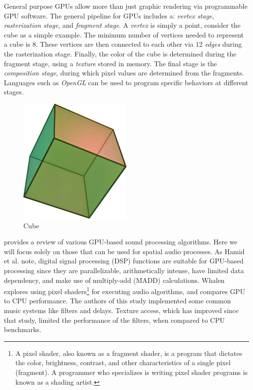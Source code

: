 General purpose GPUs allow more than just graphic rendering via programmable GPU software. The general pipeline for GPUs includes a: \textit{vertex stage}, \textit{rasterization stage}, and \textit{fragment stage}. A \textit{vertex} is simply a point, consider the cube as a simple example. The minimum number of vertices needed to represent a cube is 8. These vertices are then connected to each other via 12 \textit{edges} during the rasterization stage. Finally, the color of the cube is determined during the fragment stage, using a \textit{texture} stored in memory. The final stage is the \textit{composition stage}, during which pixel values are determined from the fragments. Languages such as \textit{OpenGL} can be used to program specific behaviors at different stages. 

\begin{figure}[ht!]%
\centering
\includegraphics[width=0.5\textwidth]{img/cube.jpg} 
\caption{Cube \cite{FileHexa46online}}
\label{fig:cube}
\end{figure}

\cite{hamid2009review} provides a review of various GPU-based sound processing algorithms. Here we will focus solely on those that can be used for spatial audio processes. As Hamid et al. note, digital signal processing (DSP) functions are suitable for GPU-based processing since they are parallelizable, arithmetically intense, have limited data dependency, and make use of multiply-add (MADD) calculations. Whalen \cite{whalen2005audio} explores using pixel shaders\footnote{A pixel shader, also known as a fragment shader, is a program that dictates the color, brightness, contrast, and other characteristics of a single pixel (fragment). A programmer who specializes is writing pixel shader programs is known as a shading artist.} for executing audio algorithms, and compares GPU to CPU performance. The authors of this study implemented some common music systems like filters and delays. Texture access, which has improved since that study, limited the performance of the filters, when compared to CPU benchmarks. 

